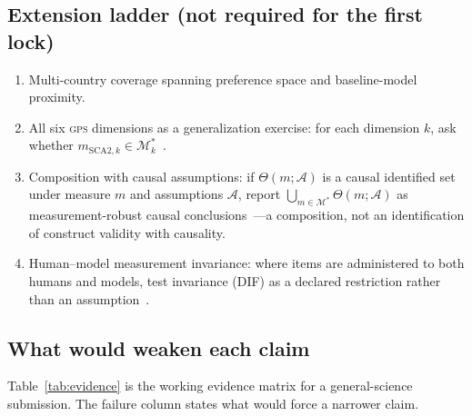\documentclass[10pt,letterpaper]{article}
\newcommand{\GPS}{\textsc{gps}}
\newcommand{\M}{\ensuremath{\mathcal{M}}}
\begin{document}
\subsection{Extension ladder (not required for the first lock)}
\begin{enumerate}
\item Multi-country coverage spanning preference space and baseline-model proximity.
\item All six \GPS{} dimensions as a generalization exercise: for each dimension $k$, ask whether $m_{\mathrm{SCA2},k}\in\M^*_k$~\cite{falk2018}.
\item Composition with causal assumptions: if $\Theta(m;\mathcal{A})$ is a causal identified set under measure $m$ and assumptions $\mathcal{A}$, report $\bigcup_{m\in\M^*}\Theta(m;\mathcal{A})$ as measurement-robust causal conclusions~\cite{manning2024}---a composition, not an identification of construct validity with causality.
\item Human--model measurement invariance: where items are administered to both humans and models, test invariance (DIF) as a declared restriction rather than an assumption~\cite{zeinfeld2026}.
\end{enumerate}

\subsection{What would weaken each claim}
Table~\ref{tab:evidence} is the working evidence matrix for a general-science submission.
The failure column states what would force a narrower claim.
\end{document}
